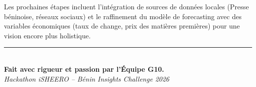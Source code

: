 \documentclass[12pt,a4paper]{article}
\begin{document}
Les prochaines étapes incluent l'intégration de sources de données locales (Presse béninoise, réseaux sociaux) et le raffinement du modèle de forecasting avec des variables économiques (taux de change, prix des matières premières) pour une vision encore plus holistique.

\vfill
\begin{center}
    \rule{0.8\linewidth}{1pt} \\
    \textbf{Fait avec rigueur et passion par l'Équipe G10.} \\
    \textit{Hackathon iSHEERO -- Bénin Insights Challenge 2026}
\end{center}
\end{document}
